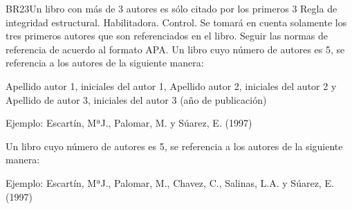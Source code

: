 \begin{BussinesRule}{BR23}{Un libro con más de 3 autores es sólo citado por los primeros 3}
    \BRitem[Tipo:] Regla de integridad estructural.
    \BRitem[Clase:] Habilitadora.
    \BRitem[Nivel:] Control.
    \BRitem[Descripción:] Se tomará en cuenta solamente los tres primeros autores que son referenciados en el libro.
    \BRitem[Motivación:] Seguir las normas de referencia de acuerdo al formato APA.
     Un libro cuyo número de autores es 5, se referencia a los autores de la siguiente manera:

    Apellido autor 1, iniciales del autor 1, Apellido autor 2, iniciales del autor 2 y Apellido de autor 3, iniciales del autor 3 (año de publicación)

Ejemplo: Escartín, MªJ., Palomar, M. y Súarez, E. (1997)

     Un libro cuyo número de autores es 5, se referencia a los autores de la siguiente manera:

    Ejemplo: Escartín, MªJ., Palomar, M., Chavez, C., Salinas, L.A. y Súarez, E. (1997)
\end{BussinesRule}